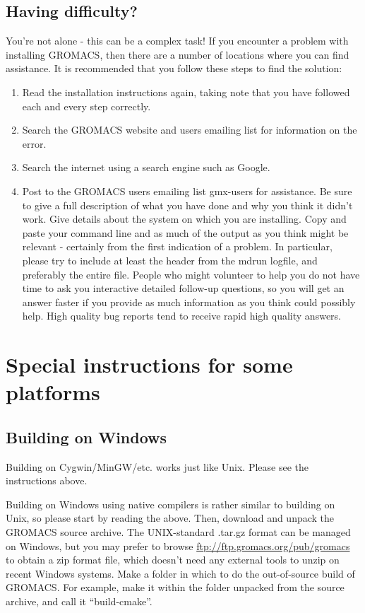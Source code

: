\documentclass{article}[12pt,a4paper,twoside]
\newcommand{\gromacs}{GROMACS}
\begin{document}
\begin{enumerate}
\subsection{Having difficulty?}
You're not alone - this can be a complex task! If you encounter a
problem with installing \gromacs{}, then there are a number of
locations where you can find assistance. It is recommended that you
follow these steps to find the solution:

\begin{enumerate}
\item Read the installation instructions again, taking note that you
  have followed each and every step correctly.
\item Search the \gromacs{} website and users emailing list for
  information on the error.
\item Search the internet using a search engine such as Google.
\item Post to the \gromacs{} users emailing list gmx-users for
  assistance. Be sure to give a full description of what you have done
  and why you think it didn't work. Give details about the system on
  which you are installing. 
  Copy and paste your command line and as
  much of the output as you think might be relevant - certainly from
  the first indication of a problem. In particular, please try to include at
  least the header from the mdrun logfile, and preferably the entire file.
  People who might volunteer to
  help you do not have time to ask you interactive detailed follow-up
  questions, so you will get an answer faster if you provide as much
  information as you think could possibly help. High quality bug reports 
  tend to receive rapid high quality answers.
\end{enumerate}

\section{Special instructions for some platforms}

\subsection{Building on Windows}
Building on Cygwin/MinGW/etc. works just like Unix. Please see the
instructions above.

Building on Windows using native compilers is rather similar to
building on Unix, so please start by reading the above. Then, download
and unpack the GROMACS source archive. The UNIX-standard .tar.gz
format can be managed on Windows, but you may prefer to browse
\url{ftp://ftp.gromacs.org/pub/gromacs} to obtain a zip format file,
which doesn't need any external tools to unzip on recent Windows
systems. Make a folder in which to do the out-of-source build of
\gromacs{}. For example, make it within the folder unpacked from the
source archive, and call it ``build-cmake''. 


\end{enumerate}
\end{document}
